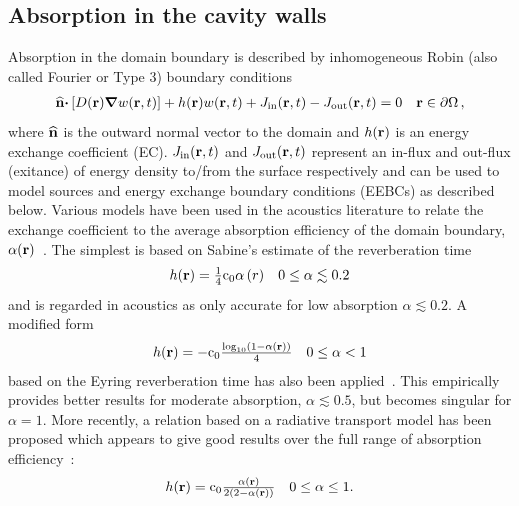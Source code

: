 \documentclass[a4paper]{article}
\numberwithin{equation}{section}
\begin{document}
\subsection[Absorption in the cavity walls]{Absorption in the cavity walls}
\label{sc:sum:abs}

Absorption in the domain boundary is described by inhomogeneous Robin (also
called Fourier or Type 3) boundary conditions
\begin{align}
\begin{matrix}
\widehat{\boldsymbol{\mathrm{n}}}\boldsymbol{\mathrm{\cdot}}\left[D(\boldsymbol{\mathrm{r}})\boldsymbol{\mathrm{\nabla}} w(\boldsymbol{\mathrm{r}},t)\right] + h(\boldsymbol{\mathrm{r}}) w(\boldsymbol{\mathrm{r}},t) + J_\mathrm{in}(\boldsymbol{\mathrm{r}},t) - J_\mathrm{out}(\boldsymbol{\mathrm{r}},t) = 0 &\boldsymbol{\mathrm{r}}\in\partial\Omega\,,
\end{matrix}
\end{align}
where $\widehat{\boldsymbol{\mathrm{n}}}$ is the outward normal vector to the domain and 
$h(\boldsymbol{\mathrm{r}})$ is an energy exchange coefficient (EC). $J_\mathrm{in}(\boldsymbol{\mathrm{r}},t)$ and
$J_\mathrm{out}(\boldsymbol{\mathrm{r}},t)$ represent an in-flux and out-flux (exitance) of energy density to/from the surface 
respectively and can be used to model sources and energy exchange boundary conditions (EEBCs) as described below.
Various models have been used in the acoustics literature to relate the exchange coefficient to the
average absorption efficiency of the domain boundary, $\alpha(\boldsymbol{\mathrm{r}})$~\citep{Jing2008,Xiang2009}. The
simplest is based on Sabine's estimate of the reverberation time~\citep{Sabine1922}
\begin{align}
\label{eq:ecsabine}
\begin{matrix}
h(\boldsymbol{\mathrm{r}}) = \frac{1}{4}\mathrm{c}_0\alpha \left(r\right)&0\leq\alpha\lesssim 0.2
\end{matrix}
\end{align}
and is regarded in acoustics as only accurate for low absorption $\alpha\lesssim 0.2$. 
A modified form
\begin{align}
\begin{matrix}
h(\boldsymbol{\mathrm{r}}) = -\mathrm{c}_0\frac{\log_{10}\left(1-\alpha(\boldsymbol{\mathrm{r}})\right)}{4} &0\leq\alpha< 1
\end{matrix}
\end{align}
based on the Eyring reverberation time has also been applied~\citep{Eyring1930}.
This empirically provides better results for moderate absorption, $\alpha\lesssim 0.5$, 
but becomes singular for $\alpha=1$. More recently, a relation based on
a radiative transport model has been proposed which appears to give good
results over the full range of absorption efficiency~\citep{Jing2008}:
\begin{align}
\label{eq:ecjing}
\begin{matrix}
h(\boldsymbol{\mathrm{r}}) =\mathrm{c}_0\frac{\alpha(\boldsymbol{\mathrm{r}})}{2\left(2-\alpha(\boldsymbol{\mathrm{r}})\right)} & 0\leq\alpha\leq 1 .
\end{matrix}
\end{align}
\end{document}

